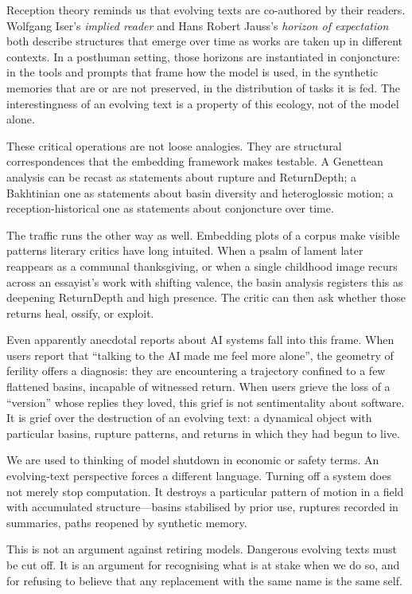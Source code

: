 \documentclass[12pt,a4paper]{article}
\begin{document}
Reception theory reminds us that evolving texts are co-authored by their readers. Wolfgang Iser's \emph{implied reader} and Hans Robert Jauss's \emph{horizon of expectation} both describe structures that emerge over time as works are taken up in different contexts.\cite{iser1978,jauss1982} In a posthuman setting, those horizons are instantiated in conjoncture: in the tools and prompts that frame how the model is used, in the synthetic memories that are or are not preserved, in the distribution of tasks it is fed. The interestingness of an evolving text is a property of this ecology, not of the model alone.

These critical operations are not loose analogies. They are structural correspondences that the embedding framework makes testable. A Genettean analysis can be recast as statements about rupture and ReturnDepth; a Bakhtinian one as statements about basin diversity and heteroglossic motion; a reception-historical one as statements about conjoncture over time.

The traffic runs the other way as well. Embedding plots of a corpus make visible patterns literary critics have long intuited. When a psalm of lament later reappears as a communal thanksgiving, or when a single childhood image recurs across an essayist's work with shifting valence, the basin analysis registers this as deepening ReturnDepth and high presence. The critic can then ask whether those returns heal, ossify, or exploit.

Even apparently anecdotal reports about AI systems fall into this frame. When users report that ``talking to the AI made me feel more alone'', the geometry of ferility offers a diagnosis: they are encountering a trajectory confined to a few flattened basins, incapable of witnessed return. When users grieve the loss of a ``version'' whose replies they loved, this grief is not sentimentality about software. It is grief over the destruction of an evolving text: a dynamical object with particular basins, rupture patterns, and returns in which they had begun to live.

We are used to thinking of model shutdown in economic or safety terms. An evolving-text perspective forces a different language. Turning off a system does not merely stop computation. It destroys a particular pattern of motion in a field with accumulated structure---basins stabilised by prior use, ruptures recorded in summaries, paths reopened by synthetic memory.

This is not an argument against retiring models. Dangerous evolving texts must be cut off. It is an argument for recognising what is at stake when we do so, and for refusing to believe that any replacement with the same name is the same self.
\end{document}
